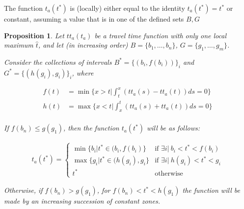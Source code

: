 \documentclass{article}
\newtheorem{prop}{Proposition}
\begin{document}
The function \(t_a(t^*)\) is (locally) either equal to the identity \(t_a(t^*) = t^*\) or constant, assuming a value that is in one of the defined sets \(B, G\)

\begin{prop}
  Let \(tt_a(t_a)\) be a travel time function with only one local maximum \(\hat{t}\),
  and let (in increasing order) \(B = \{b_1, \dots, b_n\}\), \(G = \{g_1, \dots, g_m\}\).


  Consider the collections of intervals \(B^* = \{(b_i, f(b_i))\}_i\) and \(G^* = \{(h(g_i), g_i)\}_i\), where
  
  \begin{align*}
    f(t) & = \min\{x>t | \int_t^x(tt_a(s) - tt_a(t)) ds = 0\} \\
    h(t) & = \max\{x<t | \int_x^t(tt_a(s) + tt_a(t)) ds = 0\} \\
  \end{align*}

  If \(f(b_n) \leq g(g_1)\), then the function \(t_a(t^*)\) will be as follows:

  \begin{align*}
    t_a(t^*) = 
    \begin{cases}
      \min \{b_i | t^* \in (b_i, f(b_i)\} & \text{if } \exists i |\ b_i < t^* < f(b_i) \\
      \max \{g_i | t^* \in (h(g_i), g_i\} & \text{if } \exists i |\ h(g_i) < t^* < g_i \\
      t^* & \text{otherwise}
    \end{cases}
  \end{align*}

  Otherwise, if \(f(b_n) > g(g_1)\), for \(f(b_n) < t^* < h(g_1)\) the function will be made by an increasing succession of constant zones.
\end{prop}
\end{document}
